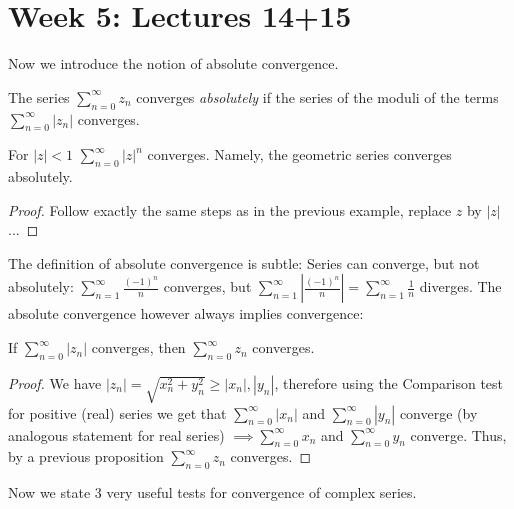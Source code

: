 \documentclass[12pt]{article}
\begin{document}
\section{Week 5: Lectures 14+15}

Now we introduce the notion of absolute convergence.

\begin{definition}
The series $\sum_{n=0}^\infty z_n$ converges \emph{absolutely} if the series of the moduli of the terms $\sum_{n=0}^\infty |z_n|$ converges.
\end{definition}

\begin{remark}
For $|z| < 1$ $\sum_{n=0}^\infty |z|^n$ converges. Namely, the geometric series converges absolutely.
\end{remark}

\begin{proof}
Follow exactly the same steps as in the previous example, replace $z$ by $|z|$...
\end{proof}

The definition of absolute convergence is subtle:
Series can converge, but not absolutely: $\sum_{n=1}^\infty \frac{(-1)^n}{n}$ converges, but $\sum_{n=1}^\infty |\frac{(-1)^n}{n}| = \sum_{n=1}^\infty \frac{1}{n}$ diverges.
The absolute convergence however always implies convergence:

\begin{proposition}
If $\sum_{n=0}^\infty |z_n|$ converges, then $\sum_{n=0}^\infty z_n$ converges.
\end{proposition}

\begin{proof}
We have $|z_n| = \sqrt{x_n^2 + y_n^2} \geq |x_n|, |y_n|$, therefore using the Comparison test for positive (real) series we get that $\sum_{n=0}^\infty |x_n|$ and $\sum_{n=0}^\infty |y_n|$ converge (by analogous statement for real series) $\implies \sum_{n=0}^\infty x_n$ and $\sum_{n=0}^\infty y_n$ converge. Thus, by a previous proposition $\sum_{n=0}^\infty z_n$ converges.
\end{proof}

Now we state 3 very useful tests for convergence of complex series.
\end{document}
